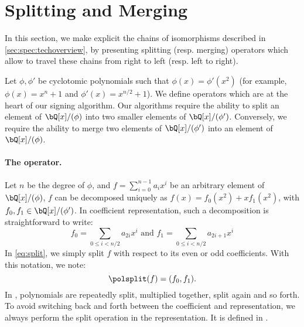 
\section{Splitting and Merging} \label{sec:spec:splitmerge}

In this section, we make explicit the chains of isomorphisms described in \cref{sec:spec:techoverview}, by presenting splitting (resp. merging) operators which allow to travel these chains from right to left (resp. left to right).

Let $\phi, \phi'$ be cyclotomic polynomials such that $\phi(x) = \phi'(x^2)$ (for example, $\phi(x) = x^n + 1$ and $\phi'(x) = x^{n/2} + 1$). We define operators which are at the heart of our signing algorithm. Our algorithms require the ability to split an element of $\bQ[x]/(\phi)$ into two smaller elements of $\bQ[x]/(\phi')$. Conversely, we require the ability to merge two elements of $\bQ[x]/(\phi')$ into an element of $\bQ[x]/(\phi)$.


\paragraph{The \splitfft operator.} Let $n$ be the degree of $\phi$, and $f = \sum_{i=0}^{n-1} a_i x^i$ be an arbitrary element of $\bQ[x]/(\phi)$, $f$ can be decomposed uniquely as $f(x) = f_0(x^2) + xf_1(x^2)$, with $f_0, f_1 \in \bQ[x]/(\phi')$. In coefficient representation, such a decomposition is straightforward to write:
\begin{equation}\label{eq:split}
f_0 = \sum\limits_{0 \leq i < n/2} a_{2i} x^i \text{\ \ \ and\ \ \ }f_1 = \sum\limits_{0 \leq i < n/2} a_{2i+1} x^i
\end{equation}
In \eqref{eq:split}, we simply split $f$ with respect to its even or odd coefficients. With this notation, we note:
\begin{equation}\label{eq:splitdef}
\polsplit(f) = (f_0,f_1).
\end{equation}
In \falcon, polynomials are repeatedly split, multiplied together, split again and so forth. To avoid switching back and forth between the coefficient and \fft representation, we always perform the split operation in the \fft representation. It is defined in \longsplitfft.


